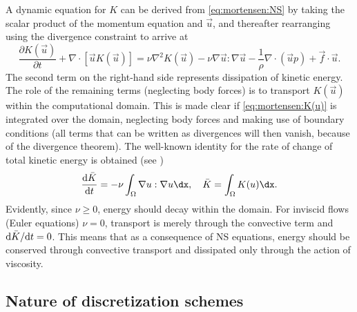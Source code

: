 A dynamic equation for $K$ can be derived from \eqref{eq:mortensen:NS}
by taking the scalar product of the momentum equation and
$\vec{u}$, and thereafter rearranging using the divergence constraint
to arrive at
\begin{equation}
 \frac{\partial K(\vec{u})}{\partial t} + \nabla \cdot [\vec{u}K(\vec{u})]
        = \nu \nabla^2 K(\vec{u}) -\nu \nabla \vec{u} : \nabla \vec{u}
      - \frac{1}{\rho}\nabla \cdot \left(\vec{u}p \right) +\vec{f}\cdot \vec{u}.
 \label{eq:mortensen:K(u)}
\end{equation}
The second term on the right-hand side represents dissipation of kinetic
energy. The role of the remaining terms (neglecting body forces) is
to transport $K(\vec{u})$ within the computational domain. This
is made clear if \eqref{eq:mortensen:K(u)} is integrated over
the domain, neglecting body forces and making use of boundary conditions
(all terms that can be written as divergences will then vanish, because of
the divergence theorem). The well-known identity for the rate of change
of total kinetic energy is obtained (see \citet{SimoArmero1994})
\begin{equation}
 \frac{\text{d} \Bar{K} }{\text{d} t} = - \nu \int_\Omega \nabla
 \vec{u} : \nabla \vec{u} \dx,
\quad \Bar{K} = \int_{\Omega} K(\vec{u}) \dx .
\end{equation}
Evidently, since $\nu \ge 0$, energy should decay
within the domain. For inviscid flows (Euler equations) $\nu=0$, transport
is merely through the convective term and $\text{d} \Bar{K}/\text{d}
t = 0$. This means that as a consequence of NS equations, energy should
be conserved through convective transport and dissipated only through
the action of viscosity.


\subsection{Nature of discretization schemes}
\label{sec:mortensen:dissipative:dispersive}


